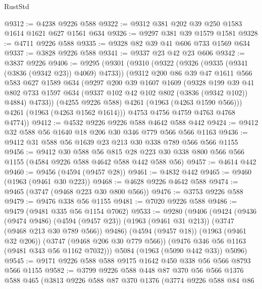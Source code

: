 \begin{lexlean}{RustStd}
\begin{coremodule}
@9312 := @4238 @9226 @588
@9322 := @9312 @381 @202 @39 @250 @1583 @1614 @1621 @627 @1561 @634
@9326 := @9297 @381 @39 @1579 @1581
@9328 := @4711 @9226 @588
@9335 := @9328 @82 @39 @41 @606 @733 @1569 @634
@9337 := @3828 @9226 @588
@9341 := @9337 @23 @42 @23 @606
@9342 := @3837 @9226
@9406 := @9295
    (@9301
      (@9310
        (@9322
          (@9326 (@9335 (@9341 (@3836 (@9342 @23)) @4069) @4733))
          (@9312
            @200
            @86
            @39
            @47
            @1611
            @566
            @583
            @627
            @1589
            @634
            (@9297
              @200
              @39
              @1607
              @1609
              (@9328
                @199
                @39
                @41
                @802
                @733
                @1597
                @634
                (@9337 @102 @42 @102 @802 (@3836 (@9342 @102)) @4884)
                @4733))
            (@4255 @9226 @588)
            @4261
            (@1963 (@4263 @1590 @566)))
          @4261
          (@1963 (@4263 @1562 @1614)))
        @4753
        @4756
        @4759
        @4763
        @4768
        @4774))
@9412 := @4532 @9226 @9226 @588 @4642 @588 @442
@9424 := @9412 @32 @588 @56 @1640 @18 @206 @30 @346 @779 @566 @566 @1163
@9436 := @9412 @31 @588 @56 @1639 @23 @213 @30 @338 @789 @566 @566 @1155
@9456 := @9412
    @30
    @588
    @56
    @815
    @28
    @223
    @30
    @338
    @800
    @566
    @566
    @1155
    (@4584 @9226 @588 @4642 @588 @442 @588 @56)
@9457 := @4614 @442
@9460 := @9456 (@4594 (@9457 @28))
@9461 := @4832 @442
@9465 := @9460 (@1963 (@9461 @30 @223))
@9468 := @4628 @9226 @4642 @588
@9474 := @9465 (@3747 (@9468 @223 @30 @800 @566))
@9476 := @3753 @9226 @588
@9479 := @9476 @338 @56 @1155
@9481 := @7020 @9226 @588
@9486 := @9479 (@9481 @335 @56 @1154 @7062)
@9533 := @9280
    (@9406
      (@9424
        (@9436
          (@9474 @9486)
          (@4594 (@9457 @23))
          (@1963 (@9461 @31 @213))
          (@3747 (@9468 @213 @30 @789 @566))
          @9486)
        (@4594 (@9457 @18))
        (@1963 (@9461 @32 @206))
        (@3747 (@9468 @206 @30 @779 @566))
        (@9476 @346 @56 @1163 (@9481 @343 @56 @1162 @7032)))
      @5084
      (@1963 (@5090 @442 @33))
      @5096)
@9545 := @9171 @9226 @588 @588 @9175 @1642 @450 @338 @56 @566 @8793 @566 @1155
@9582 := @3799
    @9226
    @588
    @448
    @87
    @370
    @56
    @566
    @1376
    @588
    @465
    (@3813
      @9226
      @588
      @87
      @370
      @1376
      (@3774
        @9226
        @588
        @84
        @86

\end{coremodule}
\end{lexlean}
